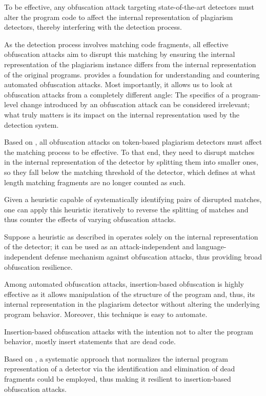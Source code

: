 %
    \begin{observation} \label{obs1} To be effective, any obfuscation attack targeting state-of-the-art detectors must alter the program code to affect the internal representation of plagiarism detectors, thereby interfering with the detection process.
    \end{observation}
As the detection process involves matching code fragments, all effective obfuscation attacks aim to disrupt this matching by ensuring the internal representation of the plagiarism instance differs from the internal representation of the original programs.
%
 provides a foundation for understanding and countering automated obfuscation attacks. Most importantly, it allows us to look at obfuscation attacks from a completely different angle: The specifics of a program-level change introduced by an obfuscation attack can be considered irrelevant; what truly matters is its impact on the internal representation used by the detection system.

Based on , all obfuscation attacks on token-based plagiarism detectors must affect the matching process to be effective.
To that end, they need to disrupt matches in the internal representation of the detector by splitting them into smaller ones, so they fall below the matching threshold of the detector, which defines at what length matching fragments are no longer counted as such.
    \begin{hypothesis} \label{hypo1}
    Given a heuristic capable of systematically identifying pairs of disrupted matches, one can apply this heuristic iteratively to reverse the splitting of matches and thus counter the effects of varying obfuscation attacks.
    \end{hypothesis}
Suppose a heuristic as described in  operates solely on the internal representation of the detector; it can be used as an attack-independent and language-independent defense mechanism against obfuscation attacks, thus providing broad obfuscation resilience.

Among automated obfuscation attacks, insertion-based obfuscation is highly effective as it allows manipulation of the structure of the program and, thus, its internal representation in the plagiarism detector without altering the underlying program behavior. Moreover, this technique is easy to automate.
    \begin{hypothesis} \label{hypo2}
    Insertion-based obfuscation attacks with the intention not to alter the program behavior, mostly insert statements that are dead code.
    \end{hypothesis}
%
Based on , a systematic approach that normalizes the internal program representation of a detector via the identification and elimination of dead fragments could be employed, thus making it resilient to insertion-based obfuscation attacks.

